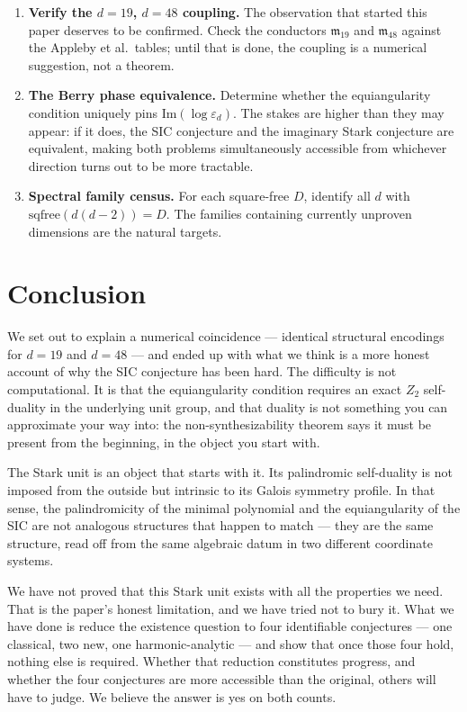\documentclass[12pt]{article}
\theoremstyle{plain}
\theoremstyle{definition}
\theoremstyle{remark}
\newcommand{\eps}{\varepsilon}
\begin{document}
\begin{enumerate}
  \item \textbf{Verify the $d = 19$, $d = 48$ coupling.} The observation that started this paper deserves to be confirmed. Check the conductors $\mathfrak{m}_{19}$ and $\mathfrak{m}_{48}$ against the Appleby et al.\ tables; until that is done, the coupling is a numerical suggestion, not a theorem.

  \item \textbf{The Berry phase equivalence.} Determine whether the equiangularity condition uniquely pins $\mathrm{Im}(\log \eps_d)$. The stakes are higher than they may appear: if it does, the SIC conjecture and the imaginary Stark conjecture are equivalent, making both problems simultaneously accessible from whichever direction turns out to be more tractable.

  \item \textbf{Spectral family census.} For each square-free $D$, identify all $d$ with $\mathrm{sqfree}(d(d-2)) = D$. The families containing currently unproven dimensions are the natural targets.
\end{enumerate}

\section*{Conclusion}

We set out to explain a numerical coincidence — identical structural encodings for $d = 19$ and $d = 48$ — and ended up with what we think is a more honest account of why the SIC conjecture has been hard. The difficulty is not computational. It is that the equiangularity condition requires an exact $Z_2$ self-duality in the underlying unit group, and that duality is not something you can approximate your way into: the non-synthesizability theorem says it must be present from the beginning, in the object you start with.

The Stark unit is an object that starts with it. Its palindromic self-duality is not imposed from the outside but intrinsic to its Galois symmetry profile. In that sense, the palindromicity of the minimal polynomial and the equiangularity of the SIC are not analogous structures that happen to match — they are the same structure, read off from the same algebraic datum in two different coordinate systems.

We have not proved that this Stark unit exists with all the properties we need. That is the paper's honest limitation, and we have tried not to bury it. What we have done is reduce the existence question to four identifiable conjectures — one classical, two new, one harmonic-analytic — and show that once those four hold, nothing else is required. Whether that reduction constitutes progress, and whether the four conjectures are more accessible than the original, others will have to judge. We believe the answer is yes on both counts.
\end{document}
